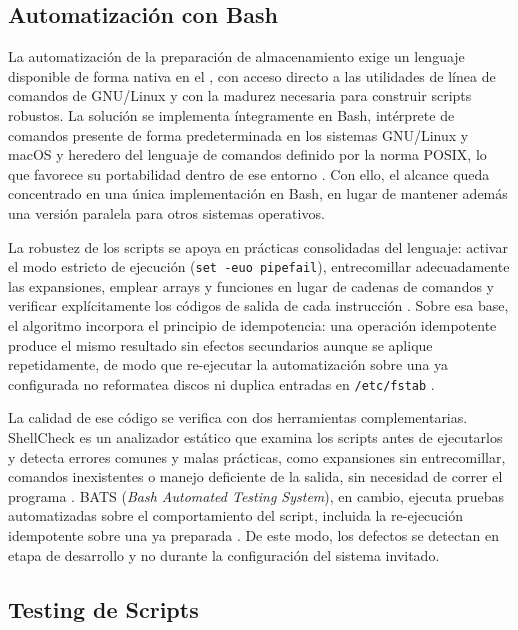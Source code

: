 \subsection{Automatización con Bash}
\label{sub:bash}

La automatización de la preparación de almacenamiento exige un lenguaje disponible de forma nativa en el \host{}, con acceso directo a las utilidades de línea de comandos de GNU/Linux y con la madurez necesaria para construir scripts robustos. La solución se implementa íntegramente en Bash, intérprete de comandos presente de forma predeterminada en los sistemas GNU/Linux y macOS y heredero del lenguaje de comandos definido por la norma POSIX, lo que favorece su portabilidad dentro de ese entorno \parencite{posix_shell, bash_best_practices}. Con ello, el alcance queda concentrado en una única implementación en Bash, en lugar de mantener además una versión paralela para otros sistemas operativos.

La robustez de los scripts se apoya en prácticas consolidadas del lenguaje: activar el modo estricto de ejecución (\texttt{set -euo pipefail}), entrecomillar adecuadamente las expansiones, emplear arrays y funciones en lugar de cadenas de comandos y verificar explícitamente los códigos de salida de cada instrucción \parencite{bash_best_practices}. Sobre esa base, el algoritmo incorpora el principio de idempotencia: una operación idempotente produce el mismo resultado sin efectos secundarios aunque se aplique repetidamente, de modo que re-ejecutar la automatización sobre una \vm{} ya configurada no reformatea discos ni duplica entradas en \texttt{/etc/fstab} \parencite{idempotency_concept, ansible_up_running}.

La calidad de ese código se verifica con dos herramientas complementarias. ShellCheck es un analizador estático que examina los scripts antes de ejecutarlos y detecta errores comunes y malas prácticas, como expansiones sin entrecomillar, comandos inexistentes o manejo deficiente de la salida, sin necesidad de correr el programa \parencite{shellcheck}. BATS (\textit{Bash Automated Testing System}), en cambio, ejecuta pruebas automatizadas sobre el comportamiento del script, incluida la re-ejecución idempotente sobre una \vm{} ya preparada \parencite{bats_testing}. De este modo, los defectos se detectan en etapa de desarrollo y no durante la configuración del sistema invitado.

\subsection{Testing de Scripts}

